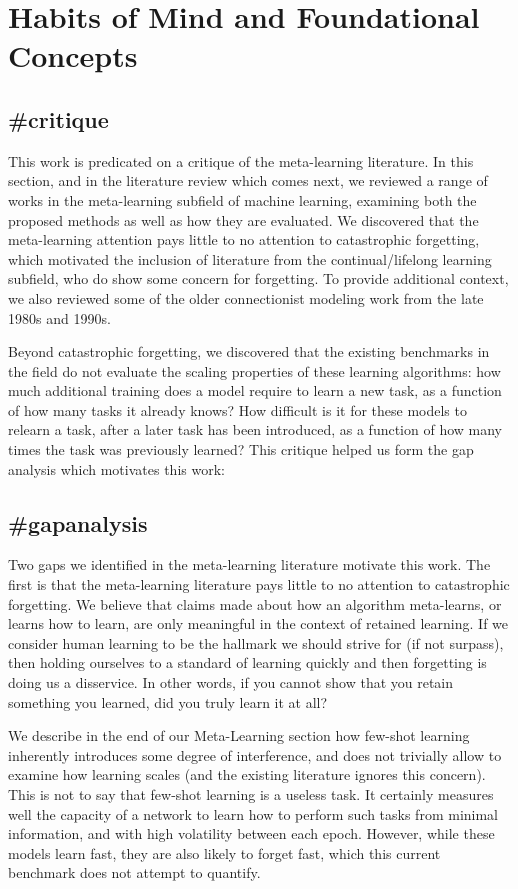 \section{Habits of Mind and Foundational Concepts}

\subsection{\#critique}
This work is predicated on a critique of the meta-learning literature. In this section, and in the literature review which comes next, we reviewed a range of works in the meta-learning subfield of machine learning, examining both the proposed methods as well as how they are evaluated. We discovered that the meta-learning attention pays little to no attention to catastrophic forgetting, which motivated the inclusion of literature from the continual/lifelong learning subfield, who do show some concern for forgetting. To provide additional context, we also reviewed some of the older connectionist modeling work from the late 1980s and 1990s. 

Beyond catastrophic forgetting, we discovered that the existing benchmarks in the field do not evaluate the scaling properties of these learning algorithms: how much additional training does a model require to learn a new task, as a function of how many tasks it already knows? How difficult is it for these models to relearn a task, after a later task has been introduced, as a function of how many times the task was previously learned? This critique helped us form the gap analysis which motivates this work:

\subsection{\#gapanalysis}
Two gaps we identified in the meta-learning literature motivate this work. The first is that the meta-learning literature pays little to no attention to catastrophic forgetting. We believe that claims made about how an algorithm meta-learns, or learns how to learn, are only meaningful in the context of retained learning. If we consider human learning to be the hallmark we should strive for (if not surpass), then holding ourselves to a standard of learning quickly and then forgetting is doing us a disservice. In other words, if you cannot show that you retain something you learned, did you truly learn it at all? 

We describe in the end of our Meta-Learning section how few-shot learning inherently introduces some degree of interference, and does not trivially allow to examine how learning scales (and the existing literature ignores this concern). This is not to say that few-shot learning is a useless task. It certainly measures well the capacity of a network to learn how to perform such tasks from minimal information, and with high volatility between each epoch. However, while these models learn fast, they are also likely to forget fast, which this current benchmark does not attempt to quantify. 

